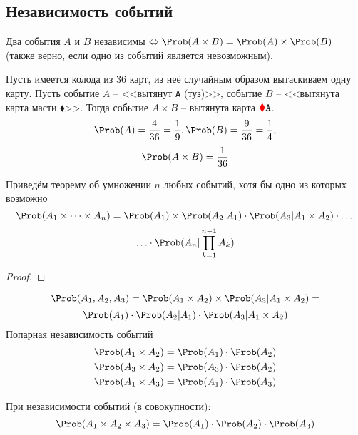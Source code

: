\subsection{Независимость событий}
\begin{definition}
  Два события $A$ и $B$ независимы $\Leftrightarrow \Prob(A \times B) = \Prob(A) \times \Prob(B)$ (также верно, если одно из событий является невозможным).
\end{definition}
\begin{example}
  Пусть имеется колода из 36 карт, из неё случайным образом вытаскиваем одну карту. Пусть событие $A$ -- <<вытянут \texttt{A} (туз)>>, событие $B$ -- <<вытянута карта масти {\color{red} $\blacklozenge$}>>. Тогда событие $A \times B$ -- вытянута карта ${\color{red} \blacklozenge} \texttt{A}$.
  \[
    \Prob(A) = \frac{4}{36} = \frac{1}{9}, \Prob(B) = \frac{9}{36} = \frac{1}{4},
  \]
  \[
    \Prob(A \times B) = \frac{1}{36}
  \]
\end{example}
Приведём теорему об умножении $n$ любых событий, хотя бы одно из которых возможно
\[
  \Prob(A_1 \times \dots \times A_n) = \Prob(A_1) \times \Prob(A_2|A_1) \cdot \Prob(A_3|A_1 \times A_2) \cdot \dots
\]
\[
  \ldots \cdot \Prob(A_n | \prod\limits_{k = 1}^{n-1} A_k)
\]
\begin{proof}

\end{proof}
\[
\Prob(A_1, A_2, A_3) = \Prob(A_1 \times A_2) \times \Prob(A_3 | A_1 \times A_2) =
\]
\[
\Prob(A_1) \cdot \Prob(A_2 | A_1) \cdot \Prob(A_3 | A_1 \times A_2)
\]
Попарная независимость событий
\begin{equation}\label{3}
\begin{split}
\Prob(A_1 \times A_2) = \Prob(A_1) \cdot \Prob(A_2) \\
\Prob(A_3 \times A_2) = \Prob(A_3) \cdot \Prob(A_2) \\
\Prob(A_1 \times A_3) = \Prob(A_1) \cdot \Prob(A_3) \\
\end{split}
\end{equation}

При независимости событий (в совокупности):
\begin{equation}\label{4}
  \Prob(A_1 \times A_2 \times A_3) = \Prob(A_1) \cdot \Prob(A_2) \cdot \Prob(A_3)
\end{equation}
